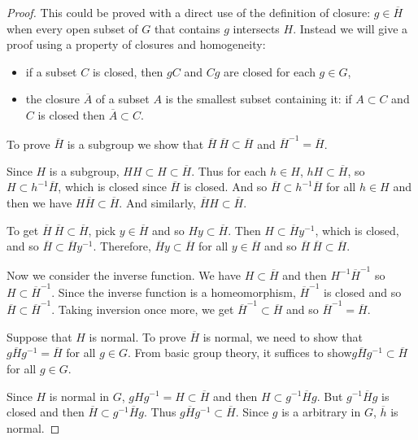 \documentclass[12pt]{report}
\theoremstyle{definition}
\begin{document}
\begin{proof}
	This could be proved with a direct use of the definition of closure: $g \in \overline{H}$ when every open subset of $G$ that contains $g$ intersects $H$. Instead we will give a proof using a property of closures and homogeneity:
	\begin{itemize}
		\item if a subset $C$ is closed, then $gC$ and $Cg$ are closed for each $g \in G$,
		\item the closure $\overline{A}$ of a subset $A$ is the smallest subset containing it: if $A\subset C$ and $C$ is closed then $\overline{A}\subset C$.
	\end{itemize}

	To prove $\overline{H}$ is a subgroup we show that $\overline{H}~\overline{H}\subset \overline{H}$ and $\overline{H}^{-1}=\overline{H}$.

	Since $H$ is a subgroup, $HH\subset H\subset \overline{H}$. Thus for each $h\in H$, $hH\subset \overline{H}$, so $H\subset h^{-1}\overline{H}$, which is closed since $\overline{H}$ is closed. And so $\overline{H}\subset h^{-1}\overline{H}$ for all $h\in H$ and then we have $H\overline{H}\subset \overline{H}$. And similarly, $\overline{H}H\subset \overline{H}$.

	To get $\overline{H}~\overline{H}\subset \overline{H}$, pick $y\in \overline{H}$ and so $Hy\subset \overline{H}$. Then $H\subset \overline{H}y^{-1}$, which is closed, and so $\overline{H}\subset \overline{H}y^{-1}$. Therefore, $\overline{H}y\subset \overline{H}$ for all $y\in \overline{H}$ and so $\overline{H}~\overline{H}\subset \overline{H}$.


	Now we consider the inverse function. We have $H\subset \overline{H}$ and then $H^{-1} \overline{H}^{-1}$ so $H\subset \overline{H}^{-1}$. Since the inverse function is a homeomorphism, $\overline{H}^{-1}$ is closed and so $\overline{H}\subset \overline{H}^{-1}$. Taking inversion once more, we get $\overline{H}^{-1}\subset \overline{H}$ and so $\overline{H}^{-1}=\overline{H}$.


	Suppose that $H$ is normal. To prove $\overline{H}$ is normal, we need to show that $g\overline{H}g^{-1}=\overline{H}$ for all $g\in G$. From basic group theory, it suffices to show$g\overline{H}g^{-1}\subset \overline{H}$ for all $g\in G$.

	Since $H$ is normal in $G$, $gHg^{-1}=H\subset \overline{H}$ and then $H\subset g^{-1}\overline{H} g$. But $ g^{-1}\overline{H} g$ is closed and then $\overline{H}\subset g^{-1}\overline{H}g$. Thus $g\overline{H}g^{-1}\subset \overline{H}$. Since $g$ is a arbitrary in $G$, $\overline{h}$ is normal.
\end{proof}
\end{document}
